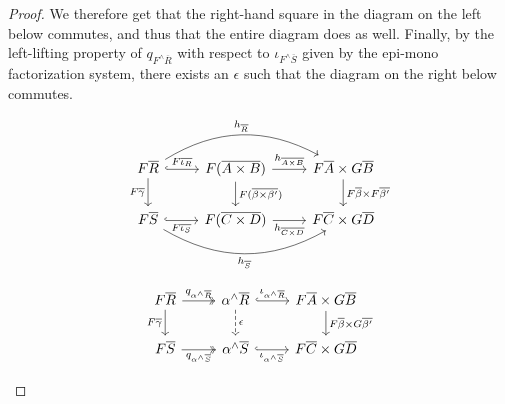 \documentclass[runningheads]{llncs}
\begin{document}
\begin{proof}
\vspace*{-0.1in}

\noindent
We therefore get that the right-hand square in the diagram on the left
below commutes, and thus that the entire diagram does as well.
Finally, by the left-lifting property of $q_{F^\wedge\overline{R}}$
with respect to $\iota_{F^\wedge\overline{S}}$ given by the epi-mono
factorization system, there exists an $\epsilon$ such that the diagram
on the right below commutes.
\begin{figure*}[ht]
  \vspace*{-0.1in}
  \hspace*{-0.5in}
  \begin{minipage}[b]{0.45\linewidth}
{\footnotesize \[
      \begin{tikzcd}
          F\overline{R}
          \ar[d, "{F\overline{\gamma}}"']
          \ar[r, hookrightarrow, "{F\overline{\iota_R}}"]
          \ar[rr, bend left, "{h_{\overline{R}}}"]
          &F(\overline{A \times B})
          \ar[d, "{F(\overline{\beta \times \beta'})}"]
          \ar[r, "{h_{\overline{A \times B}}}"]
          &F\overline{A} \times G\overline{B}
          \ar[d, "{F\overline{\beta} \times F\overline{\beta'}}"] \\
          F\overline{S}
          \ar[r, hookrightarrow, "{F\overline{\iota_S}}"']
          \ar[rr, bend right, "{h_{\overline{S}}}"']
          &F(\overline{C \times D})
          \ar[r, "{h_{\overline{C \times D}}}"']
          &F\overline{C} \times G\overline{D}
      \end{tikzcd}
      \]}
\end{minipage}
  \vspace*{-0.5in}
  \begin{minipage}[b]{0.45\linewidth}
      {\footnotesize
        \[  \vspace*{0.4in}
      \begin{tikzcd}
          F\overline{R}
          \ar[d, "{F\overline{\gamma}}"']
          \ar[r, twoheadrightarrow, "{q_{\alpha^\wedge\overline{R}}}"]
          &\alpha^\wedge\overline{R}
          \ar[d, dashed, "{\epsilon}"]
          \ar[r, hookrightarrow, "{\iota_{\alpha^\wedge\overline{R}}}"]
          &F\overline{A} \times G\overline{B}
          \ar[d, "{F\overline{\beta} \times G\overline{\beta'}}"] \\
          F\overline{S}
          \ar[r, twoheadrightarrow, "{q_{\alpha^\wedge\overline{S}}}"']
          &\alpha^\wedge\overline{S}
          \ar[r, hookrightarrow, "{\iota_{\alpha^\wedge\overline{S}}}"']
          &F\overline{C} \times G\overline{D}
      \end{tikzcd}
      \]}
\end{minipage}
\end{figure*}



\end{proof}
\end{document}
